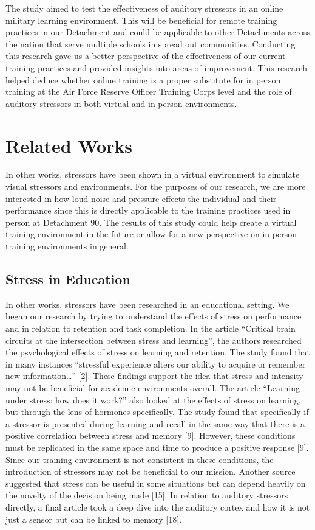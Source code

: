 \documentclass[manuscript,screen,review]{acmart}
\begin{document}
The study aimed to test the effectiveness of auditory stressors in an online military 
learning environment. This will be beneficial for remote training practices in our 
Detachment and could be applicable to other Detachments across the nation that serve 
multiple schools in spread out communities. Conducting this research gave us a better 
perspective of the effectiveness of our current training practices and provided insights 
into areas of improvement. This research helped deduce whether online training is a 
proper substitute for in person training at the Air Force Reserve Officer Training Corps 
level and the role of auditory stressors in both virtual and in person environments.   

\section{Related Works}
In other works, stressors have been shown in a virtual environment to simulate visual stressors
 and environments. For the purposes of our research, we are more interested in how loud noise 
 and pressure effects the individual and their performance since this is directly applicable 
 to the training practices used in person at Detachment 90. The results of this study could 
 help create a virtual training environment in the future or allow for a new perspective on in 
 person training environments in general. 

\subsection{Stress in Education}
In other works, stressors have been researched in an educational setting. We began our 
research by trying to understand the effects of stress on performance and in relation 
to retention and task completion. In the article “Critical brain circuits at the 
intersection between stress and learning”, the authors researched the psychological 
effects of stress on learning and retention. The study found that in many instances 
“stressful experience alters our ability to acquire or remember new information\ldots” 
[2]. These findings support the idea that stress and intensity may not be beneficial 
for academic environments overall. The article “Learning under stress: how does it work?”
 also looked at the effects of stress on learning, but through the lens of hormones 
 specifically. The study found that specifically if a stressor is presented during 
 learning and recall in the same way that there is a positive correlation between stress 
 and memory [9]. However, these conditions must be replicated in the same space and time 
 to produce a positive response [9]. Since our training environment is not consistent in 
 these conditions, the introduction of stressors may not be beneficial to our mission. 
 Another source suggested that stress can be useful in some situations but can depend 
 heavily on the novelty of the decision being made [15]. In relation to auditory stressors 
 directly, a final article took a deep dive into the auditory cortex and how it is not 
 just a sensor but can be linked to memory [18]. 
\end{document}
